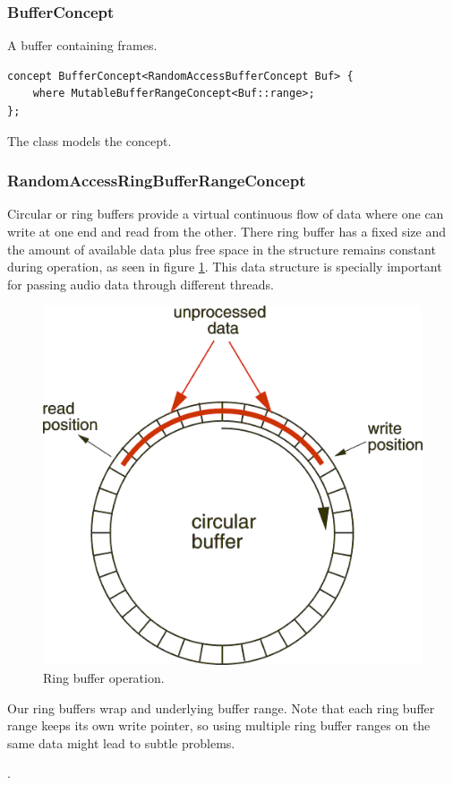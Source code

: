 \subsubsection{BufferConcept}

A buffer containing frames.

\begin{lstlisting}
concept BufferConcept<RandomAccessBufferConcept Buf> {
    where MutableBufferRangeConcept<Buf::range>;
};
\end{lstlisting}

The  class models the concept.

\subsubsection{RandomAccessRingBufferRangeConcept}

Circular or ring buffers provide a virtual continuous flow of data
where one can write at one end and read from the other. There ring
buffer has a fixed size and the amount of available data plus free
space in the structure remains constant during operation, as seen in
figure \ref{fig:ringbuf}. This data structure is specially important
for passing audio data through different threads.

\begin{figure}[h!]
  \centering
  \includegraphics[width=.6\textwidth]{pic/ringbuffer.png}
  \caption{Ring buffer operation.}
  \label{fig:ringbuf}
\end{figure}

Our ring buffers wrap and underlying buffer range. Note that each ring
buffer range keeps its own write pointer, so using multiple ring
buffer ranges on the same data might lead to subtle problems.

.


